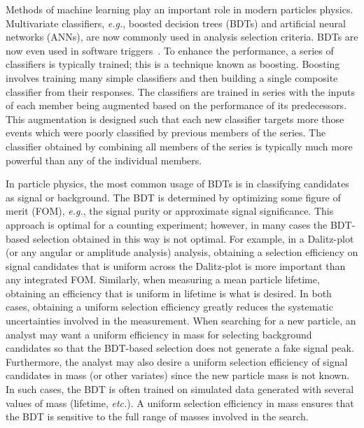 Methods of machine learning play an important role in modern particles physics. 
Multivariate classifiers, {\em e.g.}, boosted decision trees (BDTs) and artificial neural networks (ANNs), are now commonly used in analysis selection criteria. BDTs are now even used in software triggers~\cite{ref:lhcbhlt,ref:bbdt}. 
To enhance the performance, a series of classifiers is typically trained; this is a technique known as boosting.
Boosting  involves training many simple classifiers and then building a single composite classifier from their responses.
The classifiers are trained in series with the inputs of each member being augmented based on the performance of its predecessors.  This augmentation is designed such that each new classifier targets more those events which were poorly classified by previous members of the series.  The classifier obtained by combining all members of the series is typically much more powerful than any of the individual members. 

In particle physics, the most common usage of BDTs is in classifying candidates as signal or background.  The BDT is determined by optimizing some figure of merit (FOM), {\em e.g.}, the signal purity or approximate signal significance.  This approach is optimal for a counting experiment; however, in many cases the BDT-based selection obtained in this way is not optimal.  
For example, in a Dalitz-plot (or any angular or amplitude analysis) analysis, obtaining a selection efficiency on signal candidates that is uniform across the Dalitz-plot is more important than any integrated FOM.  Similarly, when measuring a mean particle lifetime, obtaining an efficiency that is uniform in lifetime is what is desired.  In both cases, obtaining a uniform selection efficiency greatly reduces the systematic uncertainties involved in the measurement.  
When searching for a new particle, an analyst may want a uniform efficiency in mass for selecting background candidates so that the BDT-based selection does not generate a fake signal peak.  Furthermore, the analyst may also desire a uniform selection efficiency of signal candidates in mass (or other variates) since the new particle mass is not known.  In such cases, the BDT is often trained on simulated data generated with several values of mass (lifetime, {\em etc.}).  A uniform selection efficiency in mass ensures that the BDT is sensitive to the full range of masses involved in the search. 
